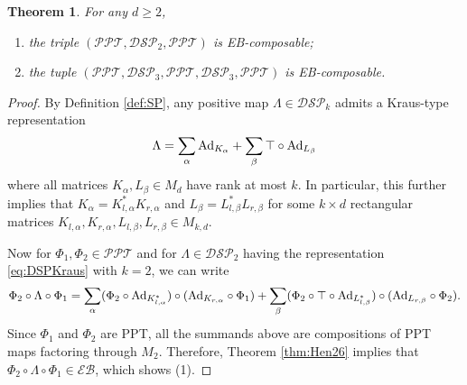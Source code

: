 \documentclass[11pt,reqno]{amsart}
\newtheorem{theorem}{Theorem}[section]
\theoremstyle{definition}
\theoremstyle{definition}
\theoremstyle{definition}
\theoremstyle{definition}
\newcommand{\DSP}{\mathcal{DSP}}
\newcommand{\EB}{\mathcal{EB}}
\newcommand{\PPT}{\mathcal{PPT}}
\newcommand{\Ad}{{\rm Ad}}
\begin{document}
\begin{theorem}\label{thm:DSP-bridge}
For any $d\geq 2$,
\begin{enumerate}
    \item the triple $(\PPT, \DSP_2, \PPT)$ is EB-composable;

    \item the tuple $(\PPT, \DSP_3, \PPT, \DSP_3, \PPT)$ is EB-composable.
\end{enumerate}
\end{theorem}
\begin{proof}
By Definition \ref{def:SP}, any positive map $\Lambda\in \DSP_k$ admits a Kraus-type representation
\begin{equation} \label{eq:DSPKraus}
    \Lambda = \sum_{\alpha} \Ad_{K_{\alpha}} + \sum_{\beta} \top \circ \Ad_{L_{\beta}}
\end{equation}
where all matrices $K_{\alpha},L_{\beta}\in M_d$ have rank at most $k$. In particular, this further implies that $K_{\alpha} = K_{l,\alpha}^*K_{r,\alpha}$ and $L_{\beta} = L_{l,\beta}^*L_{r,\beta}$ for some $k\times d$ rectangular matrices $K_{l,\alpha}, K_{r,\alpha}, L_{l,\beta}, L_{r,\beta}\in M_{k,d}$.

Now for $\Phi_1,\Phi_2\in \PPT$ and for $\Lambda\in \DSP_2$ having the representation \eqref{eq:DSPKraus} with $k=2$, we can write
    $$\Phi_2\circ \Lambda \circ \Phi_1 = \sum_{\alpha}(\Phi_2\circ \Ad_{K_{l,\alpha}^*})\circ (\Ad_{K_{r,\alpha}}\circ \Phi_1) + \sum_{\beta}(\Phi_2 \circ \top \circ \Ad_{L_{l,\beta}^*})\circ (\Ad_{L_{r,\beta}}\circ \Phi_2).$$
Since $\Phi_1$ and $\Phi_2$ are PPT, all the summands above are compositions of PPT maps factoring through $M_2$. Therefore, Theorem \ref{thm:Hen26} implies that $\Phi_2\circ \Lambda \circ \Phi_1\in \EB$, which shows (1).


\end{proof}
\end{document}
